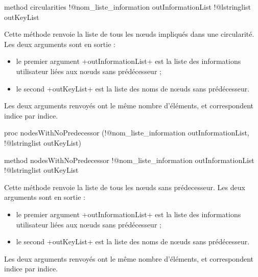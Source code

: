 \begin{galgas3}
method circularities !@nom_liste_information outInformationList
                   !@lstringlist outKeyList
\end{galgas3}

Cette méthode renvoie la liste de tous les nœuds impliqués dans une circularité. Les deux arguments sont en sortie :
\begin{itemize}
  \item le premier argument \ggst+outInformationList+ est la liste des informations utilisateur liées aux nœuds sans prédécesseur ;
  \item le second \ggst+outKeyList+ est la liste des noms de nœuds sans prédécesseur.
\end{itemize}

Les deux arguments renvoyés ont le même nombre d'éléments, et correspondent indice par indice.







\begin{galgas4}
proc nodesWithNoPredecessor (!@nom_liste_information outInformationList,
                           !@lstringlist outKeyList)
\end{galgas4}

\begin{galgas3}
method nodesWithNoPredecessor !@nom_liste_information outInformationList
                             !@lstringlist outKeyList
\end{galgas3}

Cette méthode renvoie la liste de tous les nœuds sans prédecesseur. Les deux arguments sont en sortie :
\begin{itemize}
  \item le premier argument \ggst+outInformationList+ est la liste des informations utilisateur liées aux nœuds sans prédécesseur ;
  \item le second \ggst+outKeyList+ est la liste des noms de nœuds sans prédécesseur.
\end{itemize}

Les deux arguments renvoyés ont le même nombre d'éléments, et correspondent indice par indice.







